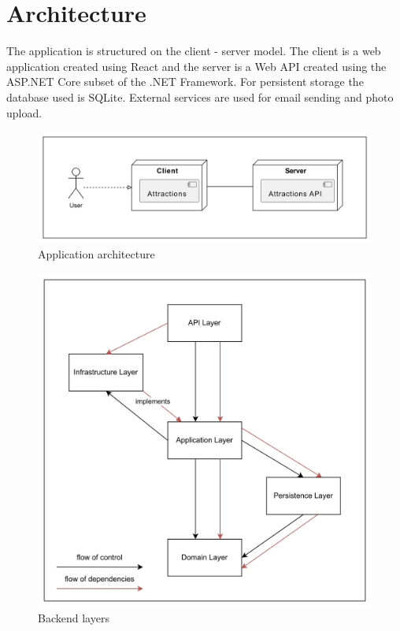 \section{Architecture}

\par The application is structured on the client - server model. The client is a web application created using React and the server is a Web API created using the ASP.NET Core subset of the .NET Framework. For persistent storage the database used is SQLite. External services are used for email sending and photo upload.

\begin{figure}[!ht]
    \centering
    \includegraphics[width=1\linewidth]{app-architecture.png}
    \caption{Application architecture}
    \label{fig:enter-label}
\end{figure}

\begin{figure}[!ht]
    \centering
    \includegraphics[width=0.96\linewidth]{backend-layers-with-flow-of-control.png}
    \caption{Backend layers}
    \label{fig:enter-label}
\end{figure}

